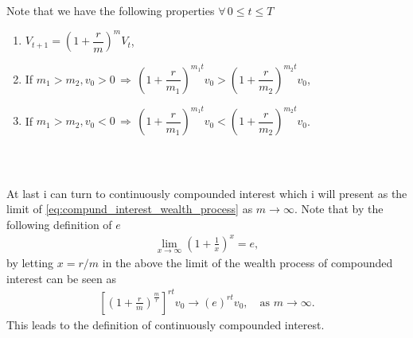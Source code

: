 \documentclass{beamer}
\numberwithin{equation}{section}
\begin{document}
\begin{frame}\frametitle{{\normalsize \secname} \\ {\large \subsecname}}
    Note that we have the following properties $\forall\, 0 \leq t \leq T$
    \begin{enumerate}
        \item $V_{t + 1} = \left( 1 + \dfrac{r}{m} \right)^{m}V_t$,
        \item If $m_1 > m_2, v_0 > 0 
        \, \Rightarrow \, 
        \left( 1 + \dfrac{r}{m_1} \right)^{m_1t}v_0
        >
        \left( 1 + \dfrac{r}{m_2} \right)^{m_2t}v_0$,
        \item If $m_1 > m_2, v_0 < 0 
        \, \Rightarrow \, 
        \left( 1 + \dfrac{r}{m_1} \right)^{m_1t}v_0
        <
        \left( 1 + \dfrac{r}{m_2} \right)^{m_2t}v_0$.
    \end{enumerate}
\end{frame}

\begin{frame}\frametitle{{\normalsize \secname} \\ {\large \subsecname}}
    At last i can turn to continuously compounded interest which i will present as the limit of \eqref{eq:compund_interest_wealth_process} as $m \rightarrow \infty$.
    Note that by the following definition of $e$
    \begin{align}
        \lim_{x \rightarrow \infty} \left(1 + \frac{1}{x}\right)^x = e,
    \end{align}
    by letting $x = r/m$ in the above the limit of the wealth process of compounded interest can be seen as
    \begin{align}
        \left[\left( 1 + \frac{r}{m} \right)^\frac{m}{r}\right]^{rt}v_0 \rightarrow
        (e)^{rt}v_0, \quad \text{as } m \rightarrow \infty.
    \end{align} 
    This leads to the definition of continuously compounded interest.
\end{frame}

\end{document}
